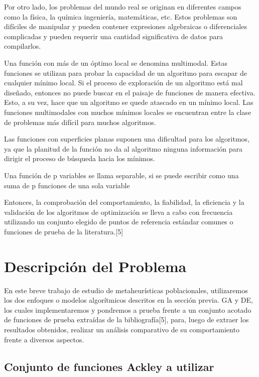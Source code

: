 \documentclass[10pt]{article}
\begin{document}
Por otro lado, los problemas del mundo real se originan en diferentes campos como la física, la química ingeniería, matemáticas, etc. Estos problemas son difíciles de manipular y pueden contener expresiones algebraicas o diferenciales complicadas y pueden requerir una cantidad significativa de datos para compilarlos.

Una función con más de un óptimo local se denomina multimodal. Estas funciones se utilizan para probar la capacidad de un algoritmo para escapar de cualquier mínimo local. Si el proceso de exploración de un algoritmo está mal diseñado, entonces no puede buscar en el paisaje de funciones de manera efectiva. Esto, a su vez, hace que un algoritmo se quede atascado en un mínimo local. Las funciones multimodales con muchos mínimos locales se encuentran entre la clase de problemas más difícil para muchos algoritmos. 

Las funciones con superficies planas suponen una dificultad para los algoritmos, ya que la planitud de la función no da al algoritmo ninguna información para dirigir el proceso de búsqueda hacia los mínimos.

Una función de p variables se llama separable, si se puede escribir como una suma de p funciones de una sola variable

Entonces, la comprobación del comportamiento, la fiabilidad, la eficiencia y la validación de los algoritmos de optimización se lleva a cabo con frecuencia utilizando un conjunto elegido de puntos de referencia estándar comunes o funciones de prueba de la literatura.[5]

\section{Descripción del Problema}

En este breve trabajo de estudio de metaheurísticas poblacionales, utilizaremos los dos enfoques o modelos algorítmicos descritos en la sección previa. GA y DE, los cuales implementaremos y pondremos a prueba frente a un conjunto acotado de funciones de prueba extraídas de la bibliografía[5], para, luego de extraer los resultados obtenidos, realizar un análisis comparativo de su comportamiento frente a diversos aspectos.


\subsection{Conjunto de funciones Ackley a utilizar}
\end{document}
